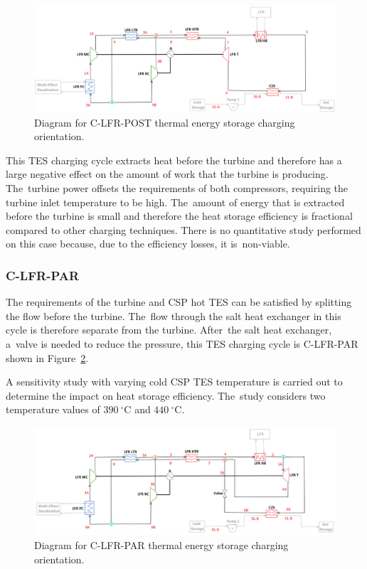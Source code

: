 \documentclass[sustainability,article,accept,moreauthors,pdftex]{Definitions/mdpi}
\begin{document}
\begin{figure}[H]
    \widefigure
    \includegraphics[width=\linewidth]{Definitions/c-lfr-post.pdf}
    \caption{Diagram for C-LFR-POST thermal energy storage charging orientation\label{c-lfr-post}.}
\end{figure}
\begin{paracol}{2}
\switchcolumn

This TES charging cycle extracts heat before the turbine and therefore has a large negative effect on the amount of work that the turbine is producing. The~turbine power offsets the requirements of both compressors, requiring the turbine inlet temperature to be high. The~amount of energy that is extracted before the turbine is small and therefore the heat storage efficiency is fractional compared to other charging techniques. There is no quantitative study performed on this case because, due to the efficiency losses, it is~non-viable. 

\subsubsection{C-LFR-PAR} 

The requirements of the turbine and CSP hot TES can be satisfied by splitting the flow before the turbine. The~flow through the salt heat exchanger in this cycle is therefore separate from the turbine. After~the salt heat exchanger, a~valve is needed to reduce the pressure, this TES charging cycle is C-LFR-PAR shown in Figure~\ref{c-lfr-par}.

A sensitivity study with varying cold CSP TES temperature is carried out to determine the impact on heat storage efficiency. The~study considers two temperature values of $390~^{\circ}$C and $440~^{\circ}$C.

\clearpage
\end{paracol}
\begin{figure}[H]
    \widefigure
    \includegraphics[width=\linewidth]{Definitions/c-lfr-par.pdf}
    \caption{Diagram for C-LFR-PAR thermal energy storage charging orientation\label{c-lfr-par}.}
\end{figure}
\end{document}
